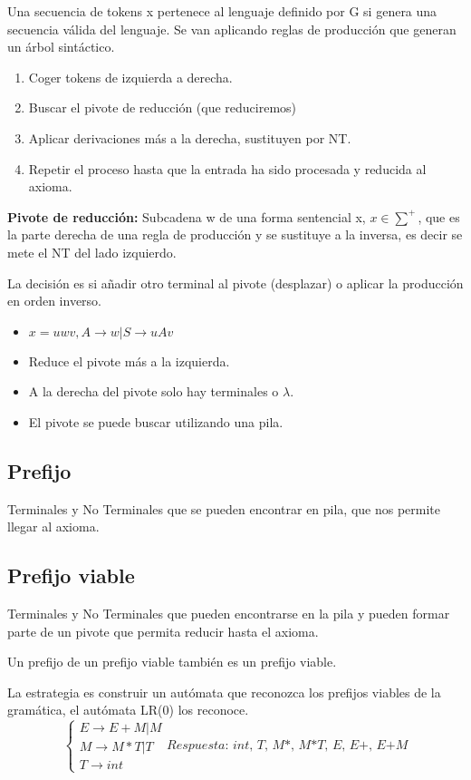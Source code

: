 \documentclass[12pt, twoside, openright]{report} %
\begin{document}
Una secuencia de tokens x pertenece al lenguaje definido por G si genera una secuencia válida del lenguaje. Se van aplicando reglas de producción que generan un árbol sintáctico.

\begin{enumerate}
	\item Coger tokens de izquierda a derecha.
	\item Buscar el pivote de reducción (que reduciremos)
	\item Aplicar derivaciones más a la derecha, sustituyen por NT.
	\item Repetir el proceso hasta que la entrada ha sido procesada y reducida al axioma.
\end{enumerate}

\textbf{Pivote de reducción:} Subcadena w de una forma sentencial x, $x \in \sum^+$, que es la parte derecha de una regla de producción y se sustituye a la inversa, es decir se mete el NT del lado izquierdo.

La decisión es si añadir otro terminal al pivote (desplazar) o aplicar la producción en orden inverso.
\begin{itemize}
	\item $x=uwv, A \rightarrow w | S \rightarrow uAv$
	\item Reduce el pivote más a la izquierda.
	\item A la derecha del pivote solo hay terminales o $\lambda$.
	\item El pivote se puede buscar utilizando una pila.
\end{itemize}

\subsection{Prefijo}
Terminales y No Terminales que se pueden encontrar en pila, que nos permite llegar al axioma.

\subsection{Prefijo viable}
Terminales y No Terminales que pueden encontrarse en la pila y pueden formar parte de un pivote que permita reducir hasta el axioma.

Un prefijo de un prefijo viable también es un prefijo viable.

La estrategia es construir un autómata que reconozca los prefijos viables de la gramática, el autómata LR(0) los reconoce.
\vspace{-10px}
$$\begin{cases}
		E \rightarrow E+M | M      \\
		M \rightarrow M*T | T      \\
		T \rightarrow \textit{int}
	\end{cases}
	\textit{Respuesta: int, T, M*, M*T, E, E+, E+M}$$
\end{document}
